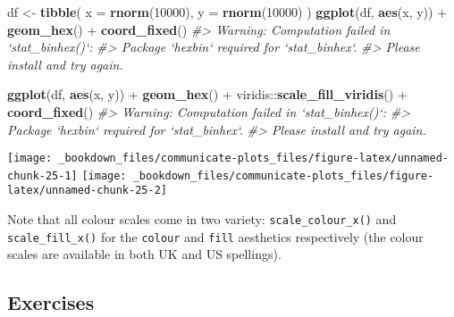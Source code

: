 \documentclass[]{book}
\newenvironment{Shaded}{\begin{snugshade}}{\end{snugshade}}
\newcommand{\KeywordTok}[1]{\textcolor[rgb]{0.13,0.29,0.53}{\textbf{{#1}}}}
\newcommand{\DataTypeTok}[1]{\textcolor[rgb]{0.13,0.29,0.53}{{#1}}}
\newcommand{\DecValTok}[1]{\textcolor[rgb]{0.00,0.00,0.81}{{#1}}}
\newcommand{\StringTok}[1]{\textcolor[rgb]{0.31,0.60,0.02}{{#1}}}
\newcommand{\CommentTok}[1]{\textcolor[rgb]{0.56,0.35,0.01}{\textit{{#1}}}}
\newcommand{\NormalTok}[1]{{#1}}
\begin{document}
\begin{Shaded}
\begin{Highlighting}[]
\NormalTok{df <-}\StringTok{ }\KeywordTok{tibble}\NormalTok{(}
  \DataTypeTok{x =} \KeywordTok{rnorm}\NormalTok{(}\DecValTok{10000}\NormalTok{),}
  \DataTypeTok{y =} \KeywordTok{rnorm}\NormalTok{(}\DecValTok{10000}\NormalTok{)}
\NormalTok{)}
\KeywordTok{ggplot}\NormalTok{(df, }\KeywordTok{aes}\NormalTok{(x, y)) +}
\StringTok{  }\KeywordTok{geom_hex}\NormalTok{() +}
\StringTok{  }\KeywordTok{coord_fixed}\NormalTok{()}
\CommentTok{#> Warning: Computation failed in `stat_binhex()`:}
\CommentTok{#> Package `hexbin` required for `stat_binhex`.}
\CommentTok{#> Please install and try again.}

\KeywordTok{ggplot}\NormalTok{(df, }\KeywordTok{aes}\NormalTok{(x, y)) +}
\StringTok{  }\KeywordTok{geom_hex}\NormalTok{() +}
\StringTok{  }\NormalTok{viridis::}\KeywordTok{scale_fill_viridis}\NormalTok{() +}
\StringTok{  }\KeywordTok{coord_fixed}\NormalTok{()}
\CommentTok{#> Warning: Computation failed in `stat_binhex()`:}
\CommentTok{#> Package `hexbin` required for `stat_binhex`.}
\CommentTok{#> Please install and try again.}
\end{Highlighting}
\end{Shaded}

\texttt{[image: \_bookdown\_files/communicate-plots\_files/figure-latex/unnamed-chunk-25-1]}
\texttt{[image: \_bookdown\_files/communicate-plots\_files/figure-latex/unnamed-chunk-25-2]}

Note that all colour scales come in two variety:
\texttt{scale\_colour\_x()} and \texttt{scale\_fill\_x()} for the
\texttt{colour} and \texttt{fill} aesthetics respectively (the colour
scales are available in both UK and US spellings).

\subsection{Exercises}\label{exercises-73}
\end{document}
